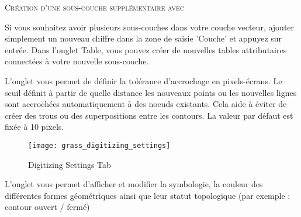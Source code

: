 \begin{Tip}\caption{\textsc{Création d'une sous-couche supplémentaire avec \qg}}
Si vous souhaitez avoir plusieurs sous-couches dans votre couche vecteur, ajouter simplement un nouveau chiffre dans la zone de saisie 'Couche' et appuyez sur entrée. Dans l'onglet Table, vous pouvez créer de nouvelles tables attributaires connectées à votre nouvelle sous-couche.
\end{Tip}

\label{label_settingtab}


L'onglet  vous permet de définir la tolérance d'accrochage en pixels-écrans. Le seuil définit à partir de quelle distance les nouveaux points ou les nouvelles lignes sont accrochées automatiquement à des noeuds existants. Cela aide à éviter de créer des trous ou des superpositions entre les contours. La valeur par défaut est fixée à 10 pixels.

\begin{figure}[ht]
 \begin{center}
 \texttt{[image: grass\_digitizing\_settings]}
 \caption{\grass Digitizing Settings Tab \nixcaption}\label{fig:grass_digitizing_settings}
 \end{center}
\end{figure}


L'onglet  vous permet d'afficher et modifier la symbologie, la couleur des différentes formes géométriques ainsi que leur statut topologique (par exemple : contour ouvert / fermé)


